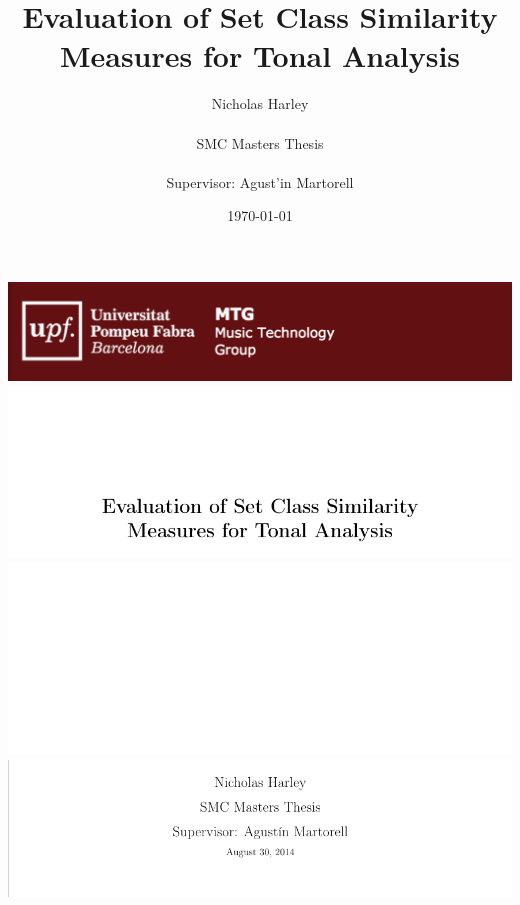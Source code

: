 \documentclass{article}
\title{\Huge \bf Evaluation of Set Class Similarity Measures for Tonal Analysis}
\author{\LARGE Nicholas Harley\\ \\ \LARGE SMC Masters Thesis\\ \\ \LARGE Supervisor: Agust\a'in Martorell}
\date{\today}
\begin{document}
\begin{centering}
\includegraphics[width=1\linewidth]{./head.png}
\includegraphics[width=1\linewidth]{./title.png}
\includegraphics[width=1\linewidth]{./space.png}
\includegraphics[width=1\linewidth]{./author.png}
\restoregeometry
\end{centering}

\clearpage
\end{document}
